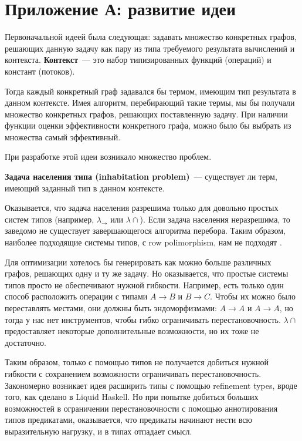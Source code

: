 \section*{Приложение А: развитие идеи}

Первоначальной идеей была следующая: задавать множество конкретных графов, решающих данную задачу как пару из типа требуемого результата вычислений и контекста.
\textbf{Контекст}~--- это набор типизированных функций (операций) и констант (потоков).

Тогда каждый конкретный граф задавался бы термом, имеющим тип результата в данном контексте.
Имея алгоритм, перебирающий такие термы, мы бы получали множество конкретных графов, решающих поставленную задачу.
При наличии функции оценки эффективности конкретного графа, можно было бы выбрать из множества самый эффективный.

При разработке этой идеи возникало множество проблем.

\textbf{Задача населения типа (inhabitation problem)}~--- существует ли терм, имеющий заданный тип в данном контексте.

Оказывается, что задача населения разрешима только для довольно простых систем типов (например, $\lambda_\rightarrow$ или $\lambda\cap$). Если задача населения неразрешима, то заведомо не существует завершающегося алгоритма перебора. Таким образом, наиболее подходящие системы типов, с row polimorphism, нам не подходят \cite{rowpoly}.

Для оптимизации хотелось бы генерировать как можно больше различных графов, решающих одну и ту же задачу. Но оказывается, что простые системы типов просто не обеспечивают нужной гибкости. Например, есть только один способ расположить операции с типами $A \rightarrow B \text{ и } B \rightarrow C$. Чтобы их можно было переставлять местами, они должны быть эндоморфизмами: $A \rightarrow A \text{ и } A \rightarrow A$, но тогда у нас нет инструментов, чтобы гибко ограничивать перестановочность. $\lambda\cap$ предоставляет некоторые дополнительные возможности, но их тоже не достаточно.

Таким образом, только с помощью типов не получается добиться нужной гибкости с сохранением возможности ограничивать перестановочность.
Закономерно возникает идея расширить типы с помощью refinement types, вроде того, как сделано в Liquid Haskell.
Но при попытке добиться больших возможностей в ограничении перестановочности с помощью аннотирования типов предикатами, оказывается, что предикаты начинают нести всю выразительную нагрузку, и в типах отпадает смысл.

